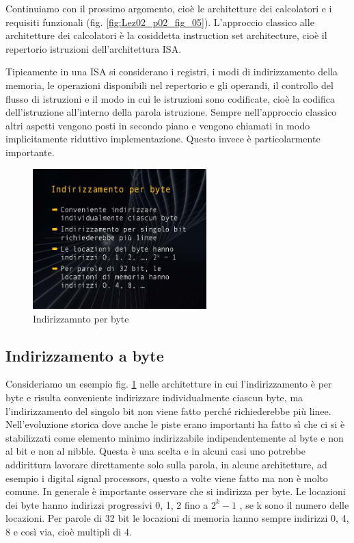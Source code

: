 Continuiamo con il prossimo argomento, cioè le architetture dei calcolatori e i requisiti funzionali (fig. \ref{fig:Lez02_p02_fig_05}).
L'approccio classico alle architetture dei calcolatori è la cosiddetta instruction set architecture, cioè il repertorio istruzioni dell'architettura ISA.

Tipicamente in una ISA si considerano i registri, i modi di indirizzamento della memoria, le operazioni disponibili nel repertorio e gli operandi, il controllo del flusso di istruzioni e il modo in cui le istruzioni sono codificate, cioè la codifica dell'istruzione all'interno della parola istruzione.
Sempre nell'approccio classico altri aspetti vengono posti in secondo piano e vengono chiamati in modo implicitamente riduttivo implementazione. Questo invece è particolarmente importante.

\FloatBarrier
\begin{figure}[H]
  \centering
  \includegraphics[width=0.6\textwidth,
                    trim=40 40 45 40, %
                    clip]{images/Lez02_p03_fig_01.png}
  \caption{Indirizzamnto per byte}
  \label{fig:Lez02_p03_fig_01}
\end{figure}
\FloatBarrier
\noindent

\subsection{Indirizzamento a byte}
Consideriamo un esempio fig. \ref{fig:Lez02_p03_fig_01} nelle architetture in cui l'indirizzamento è per byte e risulta conveniente indirizzare individualmente ciascun byte, ma l'indirizzamento del singolo bit non viene fatto perché richiederebbe più linee.
Nell'evoluzione storica dove anche le piste erano importanti ha fatto sì che ci si è stabilizzati come elemento minimo indirizzabile indipendentemente al byte e non al bit e non al nibble.
Questa è una scelta e in alcuni casi uno potrebbe addirittura lavorare direttamente solo sulla parola, in alcune architetture, ad esempio i digital signal processors, questo a volte viene fatto ma non è molto comune.
In generale è importante osservare che si indirizza per byte.
Le locazioni dei byte hanno indirizzi progressivi 0, 1, 2 fino a $2^k-1$ , se k sono il numero delle locazioni.
Per parole di 32 bit le locazioni di memoria hanno sempre indirizzi 0, 4, 8 e così via, cioè multipli di 4.

